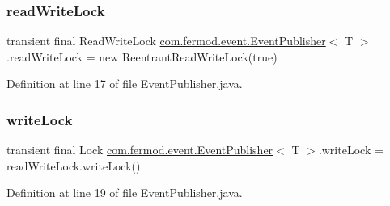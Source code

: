 \subsubsection{\texorpdfstring{readWriteLock}{readWriteLock}}
{\footnotesize\ttfamily transient final Read\+Write\+Lock \mbox{\hyperlink{a00022}{com.\+fermod.\+event.\+Event\+Publisher}}$<$ T $>$.read\+Write\+Lock = new Reentrant\+Read\+Write\+Lock(true)\hspace{0.3cm}{\ttfamily [private]}}



Definition at line 17 of file Event\+Publisher.\+java.

\mbox{\label{a00022_acde65c6b2ab5a8b71066b1fa20254cf7}} 
\subsubsection{\texorpdfstring{writeLock}{writeLock}}
{\footnotesize\ttfamily transient final Lock \mbox{\hyperlink{a00022}{com.\+fermod.\+event.\+Event\+Publisher}}$<$ T $>$.write\+Lock = read\+Write\+Lock.\+write\+Lock()\hspace{0.3cm}{\ttfamily [protected]}}



Definition at line 19 of file Event\+Publisher.\+java.

